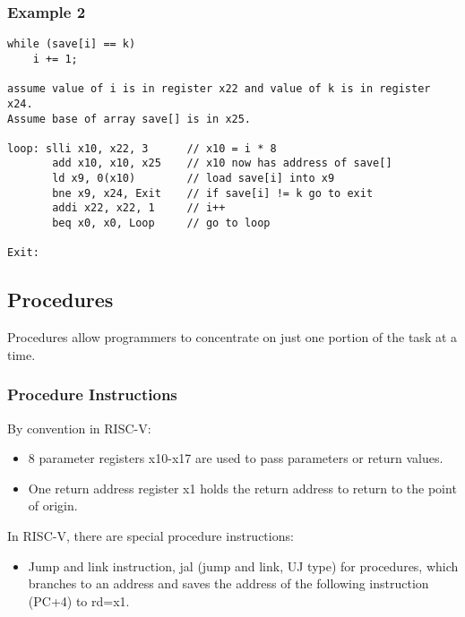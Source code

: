 \documentclass{article}
\begin{document}
\subsubsection*{Example 2}
\begin{verbatim}
while (save[i] == k)
    i += 1;

assume value of i is in register x22 and value of k is in register x24.
Assume base of array save[] is in x25.

loop: slli x10, x22, 3      // x10 = i * 8
       add x10, x10, x25    // x10 now has address of save[]
       ld x9, 0(x10)        // load save[i] into x9
       bne x9, x24, Exit    // if save[i] != k go to exit
       addi x22, x22, 1     // i++
       beq x0, x0, Loop     // go to loop

Exit:
\end{verbatim}

\subsection*{Procedures}
Procedures allow programmers to concentrate on just one portion of the task at a time.

\subsubsection{Procedure Instructions}
By convention in RISC-V:
\begin{itemize}
    \item 8 parameter registers x10-x17 are used to pass parameters or return values.
    \item One return address register x1 holds the return address to return to the point of origin.
\end{itemize}

In RISC-V, there are special procedure instructions:
\begin{itemize}
    \item Jump and link instruction, jal (jump and link, UJ type) for procedures, which branches to an address and saves the address of the following instruction (PC+4) to rd=x1.
\end{itemize}
\end{document}

